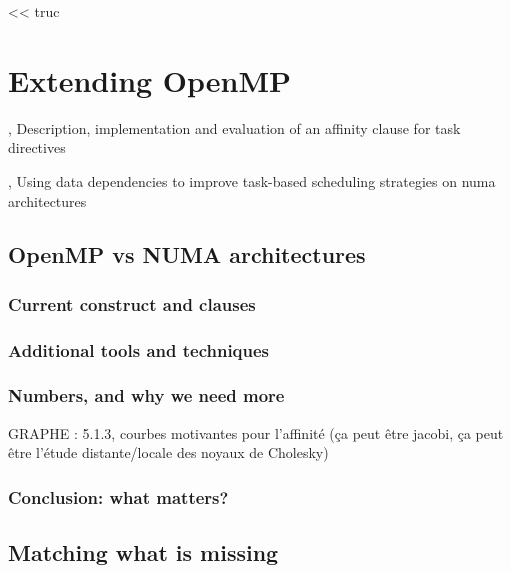 
\begin{savequote}[6cm]
<< truc
\end{savequote}

\chapter{Extending OpenMP}\label{chap:contrib:openmp}
\chaptertoc


%



\cite{Virouleau2016}, Description, implementation and evaluation of an affinity clause for task directives

\cite{Virouleau2016b}, Using data dependencies to improve task-based scheduling strategies on numa architectures


\section{OpenMP vs NUMA architectures}

\subsection{Current construct and clauses}
\subsection{Additional tools and techniques}
\subsection{Numbers, and why we need more}
GRAPHE : 5.1.3, courbes motivantes pour l'affinité (ça peut être jacobi, ça peut être l'étude distante/locale des noyaux de Cholesky)
\subsection{Conclusion: what matters?}

\section{Matching what is missing}
